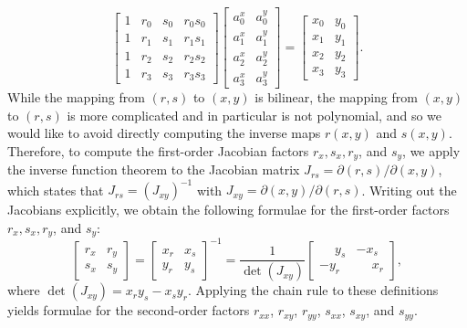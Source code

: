 \[
\begin{bmatrix}
1 & r_0 & s_0 & r_0 s_0 \\
1 & r_1 & s_1 & r_1 s_1 \\
1 & r_2 & s_2 & r_2 s_2 \\
1 & r_3 & s_3 & r_3 s_3
\end{bmatrix}
\begin{bmatrix}
a_0^x & a_0^y \\
a_1^x & a_1^y \\
a_2^x & a_2^y \\
a_3^x & a_3^y
\end{bmatrix}
=
\begin{bmatrix}
x_0 & y_0 \\
x_1 & y_1 \\
x_2 & y_2 \\
x_3 & y_3
\end{bmatrix}.
\]
While the mapping from $(r,s)$ to $(x,y)$ is bilinear, the mapping from $(x,y)$ to $(r,s)$ is more complicated and in particular is not polynomial, and so we would like to avoid directly computing the inverse maps $r(x,y)$ and $s(x,y)$. Therefore, to compute the first-order Jacobian factors $r_x, s_x, r_y$, and $s_y$, we apply the inverse function theorem to the Jacobian matrix $J_{rs} = \partial (r,s) / \partial (x,y)$, which states that $J_{rs} = \left(J_{xy}\right)^{-1}$ with $J_{xy} = \partial (x,y) / \partial (r,s)$. Writing out the Jacobians explicitly, we obtain the following formulae for the first-order factors $r_x, s_x, r_y$, and $s_y$:
\[
\begin{bmatrix}
r_x & r_y \\
s_x & s_y
\end{bmatrix}
=
\begin{bmatrix}
x_r & x_s \\
y_r & y_s
\end{bmatrix}^{-1}
=
\frac{1}{\det(J_{xy})}
\begin{bmatrix}
\phantom{-}y_s & -x_s \\
-y_r & \phantom{-}x_r
\end{bmatrix},
\]
where $\det(J_{xy}) = x_r y_s - x_s y_r$. Applying the chain rule to these definitions yields formulae for the second-order factors $r_{xx}$, $r_{xy}$, $r_{yy}$, $s_{xx}$, $s_{xy}$, and $s_{yy}$.

